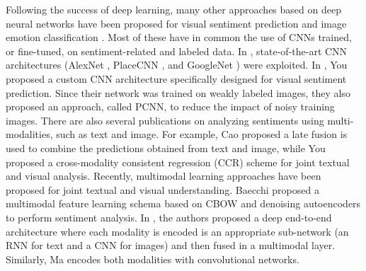 Following the success of deep learning, many other approaches based on deep neural networks have been proposed for visual sentiment prediction and image emotion classification
\cite{Campos2017,Chen2014:DeepSentiBank,Islam2016,rao2016learning,you2015robust,xu2014visual}.
Most of these have in common the use of CNNs trained, or fine-tuned, on sentiment-related and labeled data. In \cite{Campos2017,Chen2014:DeepSentiBank,Islam2016,Jou2015:VisualAffect}, %
state-of-the-art CNN architectures (\eg AlexNet \cite{krizhevsky2012imagenet}, PlaceCNN \cite{zhou2014learning}, and GoogleNet \cite{szegedy2015going}) were exploited.
In \cite{you2015robust}, You \etal proposed a custom CNN architecture specifically designed for visual sentiment prediction. Since their network was trained on weakly labeled images, they also proposed an approach, called PCNN, to reduce the impact of noisy training images. %
There are also several publications on analyzing sentiments using multi-modalities, such as text and image. For example, Cao \etal \cite{Cao2016} proposed
a late fusion is used to combine the predictions obtained from text and image, while You \etal \cite{you2016cross} proposed a cross-modality consistent regression (CCR) scheme for joint textual and visual analysis.
Recently, multimodal learning approaches have been proposed for joint textual and visual understanding. Baecchi \etal \cite{baecchi2016multimodal} proposed a multimodal feature learning schema based on CBOW and denoising autoencoders to perform sentiment analysis. In \cite{mao2014deep}, the authors proposed a deep end-to-end architecture where each modality is encoded is an appropriate sub-network (an RNN for text and a CNN for images) and then fused in a multimodal layer. Similarly, Ma \etal \cite{ma2015multimodal} encodes both modalities with convolutional networks.


